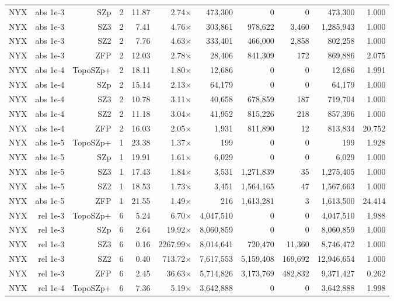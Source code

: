 \begin{tabular}{lrrrrrrrrrr}
NYX & abs 1e-3 & SZp & 2 & 11.87 & 2.74$\times$ & 473,300 & 0 & 0 & 473,300 & 1.000 \\
NYX & abs 1e-3 & SZ3 & 2 & 7.41 & 4.76$\times$ & 303,861 & 978,622 & 3,460 & 1,285,943 & 1.000 \\
NYX & abs 1e-3 & SZ2 & 2 & 7.76 & 4.63$\times$ & 333,401 & 466,000 & 2,858 & 802,258 & 1.000 \\
NYX & abs 1e-3 & ZFP & 2 & 12.03 & 2.78$\times$ & 28,406 & 841,309 & 172 & 869,886 & 2.075 \\
NYX & abs 1e-4 & TopoSZp+ & 2 & 18.11 & 1.80$\times$ & 12,686 & 0 & 0 & 12,686 & 1.991 \\
NYX & abs 1e-4 & SZp & 2 & 15.14 & 2.13$\times$ & 64,179 & 0 & 0 & 64,179 & 1.000 \\
NYX & abs 1e-4 & SZ3 & 2 & 10.78 & 3.11$\times$ & 40,658 & 678,859 & 187 & 719,704 & 1.000 \\
NYX & abs 1e-4 & SZ2 & 2 & 11.18 & 3.04$\times$ & 41,952 & 815,226 & 218 & 857,396 & 1.000 \\
NYX & abs 1e-4 & ZFP & 2 & 16.03 & 2.05$\times$ & 1,931 & 811,890 & 12 & 813,834 & 20.752 \\
NYX & abs 1e-5 & TopoSZp+ & 1 & 23.38 & 1.37$\times$ & 199 & 0 & 0 & 199 & 1.928 \\
NYX & abs 1e-5 & SZp & 1 & 19.91 & 1.61$\times$ & 6,029 & 0 & 0 & 6,029 & 1.000 \\
NYX & abs 1e-5 & SZ3 & 1 & 17.43 & 1.84$\times$ & 3,531 & 1,271,839 & 35 & 1,275,405 & 1.000 \\
NYX & abs 1e-5 & SZ2 & 1 & 18.53 & 1.73$\times$ & 3,451 & 1,564,165 & 47 & 1,567,663 & 1.000 \\
NYX & abs 1e-5 & ZFP & 1 & 21.55 & 1.49$\times$ & 216 & 1,613,281 & 3 & 1,613,500 & 24.414 \\
NYX & rel 1e-3 & TopoSZp+ & 6 & 5.24 & 6.70$\times$ & 4,047,510 & 0 & 0 & 4,047,510 & 1.988 \\
NYX & rel 1e-3 & SZp & 6 & 2.64 & 19.92$\times$ & 8,060,859 & 0 & 0 & 8,060,859 & 1.000 \\
NYX & rel 1e-3 & SZ3 & 6 & 0.16 & 2267.99$\times$ & 8,014,641 & 720,470 & 11,360 & 8,746,472 & 1.000 \\
NYX & rel 1e-3 & SZ2 & 6 & 0.40 & 713.72$\times$ & 7,617,553 & 5,159,408 & 169,692 & 12,946,654 & 1.000 \\
NYX & rel 1e-3 & ZFP & 6 & 2.45 & 36.63$\times$ & 5,714,826 & 3,173,769 & 482,832 & 9,371,427 & 0.262 \\
NYX & rel 1e-4 & TopoSZp+ & 6 & 7.36 & 5.19$\times$ & 3,642,888 & 0 & 0 & 3,642,888 & 1.998 \\

\end{tabular}
